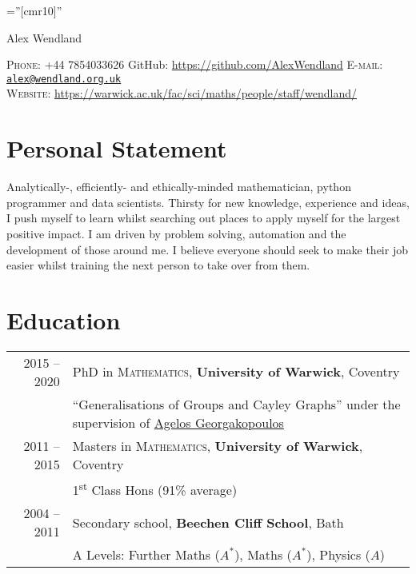 \documentclass[a4paper,10pt]{article}
\begin{document}
\pagestyle{empty} %

\font\fb=''[cmr10]'' %

\par{\centering
		{\Huge Alex Wendland
	}\bigskip\par}
\vspace{-0.3 cm}
\begin{center}
	\textsc{Phone:} +44 7854033626 \hspace{1cm} GitHub: \href{https://github.com/AlexWendland}{https://github.com/AlexWendland} \hspace{1cm} \textsc{E-mail:} \href{mailto:alex@wendland.org.uk}{\texttt{alex@wendland.org.uk}}\\
	\textsc{Website:} \href{https://warwick.ac.uk/fac/sci/maths/people/staff/wendland/}{https://warwick.ac.uk/fac/sci/maths/people/staff/wendland/}
\end{center}


\section{Personal Statement}
Analytically-, efficiently- and ethically-minded mathematician, python programmer and data scientists. Thirsty for new knowledge, experience and ideas, I push myself to learn whilst searching out places to apply myself for the largest positive impact. I am driven by problem solving, automation and the development of those around me. I believe everyone should seek to make their job easier whilst training the next person to take over from them.

\vspace{-0.05 in}

\section{Education}
\begin{tabular}{rl}	
	\textsc{} 2015 -- 2020 & PhD in \textsc{Mathematics}, \textbf{University of Warwick}, Coventry\\
	& ``Generalisations of Groups and Cayley Graphs'' under the supervision of \href{https://homepages.warwick.ac.uk/~maslar/}{Agelos Georgakopoulos}\\
	\textsc{} 2011 -- 2015& Masters in \textsc{Mathematics}, \textbf{University of Warwick}, Coventry\\
	& 1\textsuperscript{st} Class Hons (91\% average)\\
	\textsc{} 2004 -- 2011& Secondary school, \textbf{Beechen Cliff School}, Bath\\
	&  A Levels: Further Maths ($A^{\ast}$), Maths ($A^{\ast}$), Physics ($A$)
\end{tabular}
\end{document}

